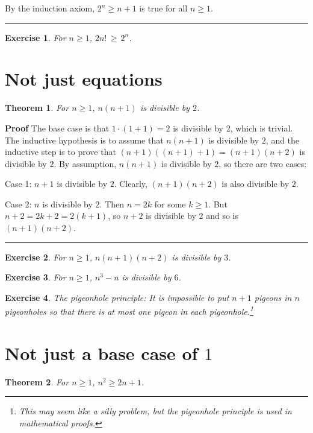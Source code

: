 \documentclass[11pt,a4paper]{report}
\newcommand*{\qed}{\hfill\rule{1ex}{1.5ex}}
\newtheorem{theorem}{Theorem}
\newtheorem{exercise}{Exercise}
\begin{document}
By the induction axiom, $2^n \geq n+1$ is true for all $n\geq 1$.\qed

\begin{exercise}
For $n\geq 1$, $2n! \,\geq\, 2^n$.
\end{exercise}

\section{Not just equations}

\begin{theorem}\label{t.div2}
For $n\geq 1$, $n(n+1)$ is divisible by $2$.
\end{theorem}

\textbf{Proof} The base case is that $1\cdot (1+1) = 2$ is divisible by $2$, which is trivial. The inductive hypothesis is to assume that $n(n+1)$ is divisible by $2$, and the inductive step is to prove that $(n+1)((n+1)+1)=(n+1)(n+2)$ is divisible by $2$. By assumption, $n(n+1)$ is divisible by $2$, so there are two cases:

Case 1: $n+1$ is divisible by $2$. Clearly, $(n+1)(n+2)$ is also divisible by $2$.

Case 2: $n$ is divisible by $2$. Then $n=2k$ for some $k\geq 1$. But $n+2 = 2k+2 = 2(k+1)$, so $n+2$ is divisible by $2$ and so is $(n+1)(n+2)$.\qed

\begin{exercise}\label{e.div3}
For $n\geq 1$, $n(n+1)(n+2)$ is divisible by $3$.
\end{exercise}

\begin{exercise}\label{e.div6}
For $n\geq 1$, $n^3-n$ is divisible by $6$.
\end{exercise}

\begin{exercise}
The pigeonhole principle: It is impossible to put $n+1$ pigeons in $n$ pigeonholes so that there is at most one pigeon in each pigeonhole.\footnote{This may seem like a silly problem, but the pigeonhole principle is used in mathematical proofs.}
\end{exercise}

\section{Not just a base case of $1$}

\begin{theorem} For $n\geq 1$, $n^2\geq 2n+1$.
\end{theorem}
\end{document}
